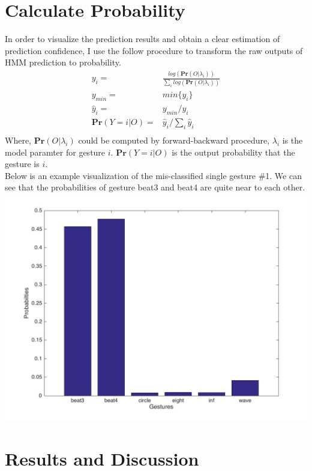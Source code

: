 \documentclass[english]{article}
\begin{document}
\section {Calculate Probability}
In order to visualize the prediction results and obtain a clear estimation of prediction confidence, I use the follow procedure to transform the raw outputs of HMM prediction to probability. 
\begin{align*}
y_i =& \frac{log(\mathbf{Pr}(O|\lambda_i))}{\sum_i log(\mathbf{Pr}(O|\lambda_i))}\\
y_{min} =& min\{y_i\}\\
\hat y_i =& y_{min}/y_i \\
\mathbf{Pr}(Y = i|O) =& \hat y_i/\sum_i{\hat y_i} \\
\end{align*}
Where, $\mathbf{Pr}(O|\lambda_i)$ could be computed by forward-backward procedure, $\lambda_i$ is the model paramter for gesture $i$. $\mathbf{Pr}(Y = i|O)$ is the output probability that the gesture is $i$. \\
Below is an example visualization of the mis-classified single gesture \#1. We can see that the probabilities of gesture beat3 and beat4 are quite near to each other.\\
\includegraphics[width=\textwidth]{images/probs.jpg}\\
\section {Results and Discussion}
\end{document}
